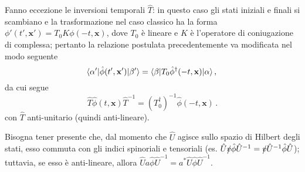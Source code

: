 \documentclass{article}
\begin{document}
Fanno eccezione le inversioni temporali $\hat{T}$: in questo caso gli stati iniziali e finali si scambiano e la trasformazione nel caso classico ha la forma $\phi'(t', \mathbf{x}') = T_0 K \phi(-t, \mathbf{x})$, dove $T_0$ è lineare e $K$ è l'operatore di coniugazione di complessa; pertanto la relazione postulata precedentemente va modificata nel modo seguente
\begin{equation}
  \langle \alpha' \vert \hat{\phi}(t', \mathbf{x}') \vert \beta' \rangle = \langle \beta \vert T_0 \hat{\phi}^\dagger(-t, \mathbf{x}) \vert \alpha \rangle \, , \\
\end{equation}
da cui segue
\begin{equation}
  \hat{T} \hat{\phi}(t,\mathbf{x}) \hat{T}^{-1} = \left( T_0^\dagger \right)^{-1} \hat{\phi}(-t, \mathbf{x}) \, . 
\end{equation}
con $\hat{T}$ anti-unitario (quindi anti-lineare). 

Bisogna tener presente che, dal momento che $\hat{U}$ agisce sullo spazio di Hilbert degli stati, esso commuta con gli indici spinoriali e tensoriali (es. $\hat{U} \slashed{v} \hat{\phi} \hat{U}^{-1} = \slashed{v} \hat{U}^{-1} \hat{\phi} \hat{U}$); tuttavia, se esso è anti-lineare, allora $\hat{U} a \hat{\phi} \hat{U}^{-1} = a^* \hat{U} \hat{\phi} \hat{U}^{-1}$.
\end{document}
